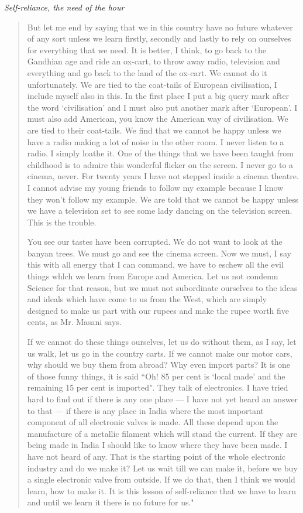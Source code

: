 \medskip
\noindent
{\em Self-reliance, the need of the hour}
\begin{quote}
{\fontsize{10pt}{12pt}\selectfont
But let me end by saying that we in this country have no future whatever of any sort unless we learn firstly, secondly and lastly to rely on ourselves for everything that we need. It is better, I think, to go back to the Gandhian age and ride an ox-cart, to throw away radio, television and everything and go back to the land of the ox-cart. We cannot do it unfortunately. We are tied to the coat-tails of European civilisation, I include myself also in this. In the first place I put a big query mark after the word `civilisation' and I must also put another mark after `European'. I must also add American, you know the American way of civilisation. We are tied to their coat-tails. We find that we cannot be happy unless we have a radio making a lot of noise in the other room. I never listen to a radio. I simply loathe it. One of the things that we have been taught from childhood is to admire this wonderful flicker on the screen. I never go to a cinema, never. For twenty years I have not stepped inside a cinema theatre. I cannot advise my young friends to follow my example because I know they won't follow my example. We are told that we cannot be happy unless we have a television set to see some lady dancing on the television screen. This is the trouble.

You see our tastes have been corrupted. We do not want to look at the banyan trees. We must go and see the cinema screen. Now we must, I say this with all energy that I can command, we have to eschew all the evil things whlch we learn from Europe and America. Let us not condemn Science for that reason, but we must not subordinate ourselves to the ideas and ideals which have come to us from the West, which are simply designed to make us part with our rupees and make the rupee worth five cents, as Mr. Masani says.

If we cannot do these things ourselves, let us do without them, as I say, let us walk, let us go in the country carts. If we cannot make our motor cars, why should we buy them from abroad? Why even import parts? It is one of those funny things, it is said ``Oh! 85 per cent is `local made' and the remaining 15 per cent is imported". They talk of electronics. I have tried hard to find out if there is any one place --- I have not yet heard an answer to that --- if there is any place in India where the most important component of all electronic valves is made. All these depend upon the manufacture of a metallic filament which will stand the current. If they are being made in India I should like to know where they have been made. I have not heard of any. That is the starting point of the whole electronic industry and do we make it? Let us wait till we can make it, before we buy a single electronic valve from outside. If we do that, then I think we would learn, how to make it. It is this lesson of self-reliance that we have to learn and until we learn it there is no future for us."
}\relax
\end{quote}

